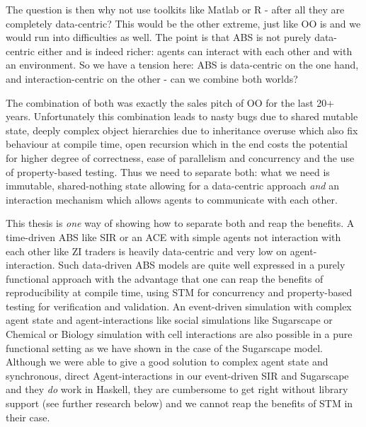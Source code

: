 The question is then why not use toolkits like Matlab or R - after all they are completely data-centric? This would be the other extreme, just like OO is and we would run into difficulties as well. The point is that ABS is not purely data-centric either and is indeed richer: agents can interact with each other and with an environment. So we have a tension here: ABS is data-centric on the one hand, and interaction-centric on the other - can we combine both worlds?

The combination of both was exactly the sales pitch of OO for the last 20+ years. Unfortunately this combination leads to nasty bugs due to shared mutable state, deeply complex object hierarchies due to inheritance overuse which also fix behaviour at compile time, open recursion which in the end costs the potential for higher degree of correctness, ease of parallelism and concurrency and the use of property-based testing. Thus we need to separate both: what we need is immutable, shared-nothing state allowing for a data-centric approach \textit{and} an interaction mechanism which allows agents to communicate with each other.

\medskip

This thesis is \textit{one} way of showing how to separate both and reap the benefits. A time-driven ABS like SIR or an ACE with simple agents not interaction with each other like ZI traders is heavily data-centric and very low on agent-interaction. Such data-driven ABS models are quite well expressed in a purely functional approach with the advantage that one can reap the benefits of reproducibility at compile time, using STM for concurrency and property-based testing for verification and validation. An event-driven simulation with complex agent state and agent-interactions like social simulations like Sugarscape or Chemical or Biology simulation with cell interactions are also possible in a pure functional setting as we have shown in the case of the Sugarscape model. Although we were able to give a good solution to complex agent state and synchronous, direct Agent-interactions in our event-driven SIR and Sugarscape and they \textit{do} work in Haskell, they are cumbersome to get right without library support (see further research below) and we cannot reap the benefits of STM in their case. 


